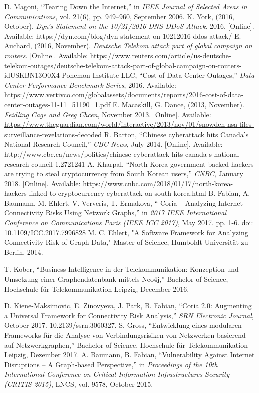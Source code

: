 \documentclass[conference, 11pt]{IEEEtran}
\begin{document}
\begin{thebibliography}{00}
D. Magoni, ``Tearing Down the Internet,'' in \textit{ IEEE Journal of Selected Areas in Communications}, vol. 21(6), pp. 949–960, September 2006. %
K. York, (2016, October). \textit{Dyn’s Statement on the 10/21/2016 DNS DDoS Attack}. 2016. [Online]. Available: https://dyn.com/blog/dyn-statement-on-10212016-ddos-attack/ %
E. Auchard, (2016, November). \textit{Deutsche Telekom attack part of global campaign on routers}. [Online]. Available: https://www.reuters.com/article/us-deutsche-telekom-outages/deutsche-telekom-attack-part-of-global-campaign-on-routers-idUSKBN13O0X4 %
Ponemon Institute LLC, ``Cost of Data Center Outages,'' \textit{Data Center Performance Benchmark Series}, 2016. Available: https://www.vertivco.com/globalassets/documents/reports/2016-cost-of-data-center-outages-11-11\_51190\_1.pdf %
 E. Macaskill, G. Dance, (2013, November). \textit{Feidling Cage and Greg Chcen}, November 2013. [Online]. Available: \url{https://www.theguardian.com/world/interactive/2013/nov/01/snowden-nsa-files-surveillance-revelations-decoded} %
R. Barton, ``Chinese cyberattack hits Canada's National Research Council,'' \textit{CBC News}, July 2014. [Online]. Available: http://www.cbc.ca/news/politics/chinese-cyberattack-hits-canada-s-national-research-council-1.2721241 %
A. Kharpal, ``North Korea government-backed hackers are trying to steal cryptocurrency from South Korean users,'' \textit{CNBC}, January 2018. [Online]. Available: https://www.cnbc.com/2018/01/17/north-korea-hackers-linked-to-cryptocurrency-cyberattack-on-south-korea.html %
B. Fabian, A. Baumann, M. Ehlert, V. Ververis, T. Ermakova, `` Coria – Analyzing Internet Connectivity Risks Using Network Graphs,'' in \textit{2017 IEEE International Conference on Communications Paris (IEEE ICC 2017)}, May 2017.  pp. 1-6. doi: 10.1109/ICC.2017.7996828 %
M. C. Ehlert, "A Software Framework for Analyzing Connectivity Risk of Graph Data," Master of Science, Humboldt-Universität zu Berlin, 2014. %

T. Kober, ``Business Intelligence in der Telekommunikation: Konzeption und Umsetzung einer Graphendatenbank mittels Neo4j,'' Bachelor of Science, Hochschule für Telekommunikation Leipzig, December 2016. %

 D. Kiene-Maksimovic, E. Zinovyeva, J. Park, B. Fabian, ``Coria 2.0: Augmenting a Universal Framework for Connectivity Risk Analysis,'' \textit{SRN Electronic Journal}, October 2017. 10.2139/ssrn.3060327.  %
S. Gross, ``Entwicklung eines modularen Frameworks für die Analyse von Verbindungsrisiken von Netzwerken basierend auf Netzwerkgraphen,'' Bachelor of Science, Hochschule für Telekommunikation Leipzig, Dezember 2017. %
A. Baumann, B. Fabian, ``Vulnerability Against Internet Disruptions – A Graph-based Perspective,''  in \textit{Proceedings of the 10th International Conference on Critical Information Infrastructures Security (CRITIS 2015)}, LNCS, vol. 9578, October 2015.


\end{thebibliography}
\end{document}
